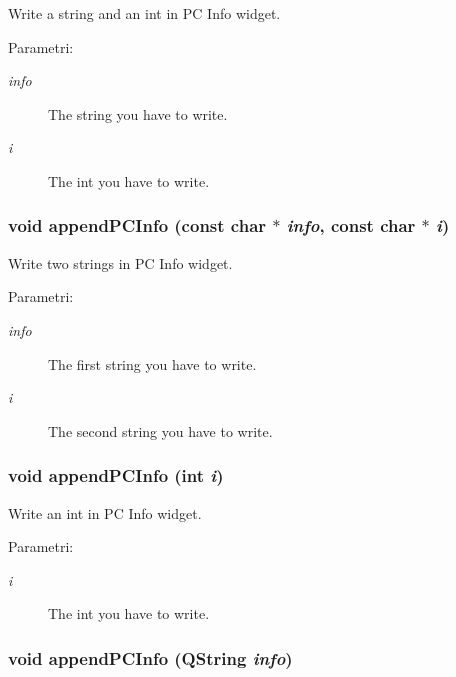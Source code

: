 Write a string and an int in PC Info widget. \begin{Desc}
\item[Parametri:]
\begin{description}
\item[{\em info}]The string you have to write. \item[{\em i}]The int you have to write. \end{description}
\end{Desc}
\hypertarget{classMainWindow_6c1312a8d376cb19366cce1e084ce01b}{
\subsubsection[appendPCInfo]{\setlength{\rightskip}{0pt plus 5cm}void append\-PCInfo (const char $\ast$ {\em info}, const char $\ast$ {\em i})}}
\label{classMainWindow_6c1312a8d376cb19366cce1e084ce01b}


Write two strings in PC Info widget. \begin{Desc}
\item[Parametri:]
\begin{description}
\item[{\em info}]The first string you have to write. \item[{\em i}]The second string you have to write. \end{description}
\end{Desc}
\hypertarget{classMainWindow_1fa8f6b4ad5becd6b6adb85c18f3a238}{
\subsubsection[appendPCInfo]{\setlength{\rightskip}{0pt plus 5cm}void append\-PCInfo (int {\em i})}}
\label{classMainWindow_1fa8f6b4ad5becd6b6adb85c18f3a238}


Write an int in PC Info widget. \begin{Desc}
\item[Parametri:]
\begin{description}
\item[{\em i}]The int you have to write. \end{description}
\end{Desc}
\hypertarget{classMainWindow_00ae5979048fe2b58d6d7f3c526d9f85}{
\subsubsection[appendPCInfo]{\setlength{\rightskip}{0pt plus 5cm}void append\-PCInfo (QString {\em info})}}
\label{classMainWindow_00ae5979048fe2b58d6d7f3c526d9f85}



